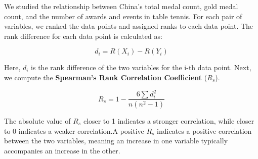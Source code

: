 \documentclass[12pt]{article}  %
\begin{document}
We studied the relationship between China's total medal count, gold medal count, and the number of awards and events in table tennis. For each pair of variables, we ranked the data points and assigned ranks to each data point. The rank difference for each data point is calculated as:

\begin{equation}
	d_i = R(X_i) - R(Y_i)
\end{equation}


Here, $d_i$ is the rank difference of the two variables for the i-th data point. 
Next, we compute the \textbf{Spearman's Rank Correlation Coefficient} ($R_s$). 

\begin{equation}
	R_s = 1 - \frac{6 \sum d_i^2}{n(n^2 - 1)}
\end{equation}


The absolute value of $R_s$ closer to 1 indicates a stronger correlation, while closer to 0 indicates a weaker correlation.A positive $R_s$ indicates a positive correlation between the two variables, meaning an increase in one variable typically accompanies an increase in the other. 
\end{document}
